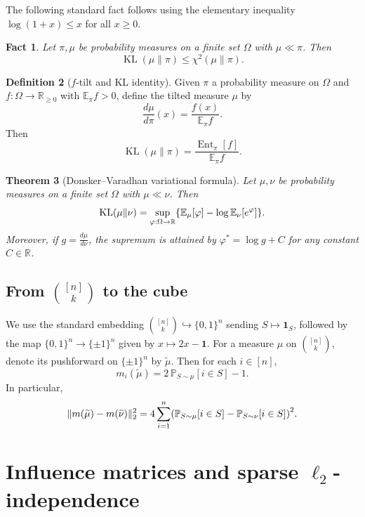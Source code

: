 \documentclass[11pt,reqno,letterpaper]{amsart}
\renewcommand{\P}{\mathbb{P}}
\numberwithin{equation}{section}
\newtheorem{theorem}{Theorem}[section]
\newtheorem{fact}[theorem]{Fact}
\theoremstyle{definition}
\newtheorem{definition}[theorem]{Definition}
\DeclareMathOperator{\Ent}{Ent}
\newcommand{\KL}{\operatorname{KL}}
\let\originalleft\left
\let\originalright\right
\renewcommand{\left}{\mathopen{}\mathclose\bgroup\originalleft}
\renewcommand{\right}{\aftergroup\egroup\originalright}
\begin{document}
The following standard fact follows using the elementary inequality $\log(1+x) \leq x$ for all $x \geq 0$.

\begin{fact}\label{fact:kl-chi2-inequality}
Let $\pi,\mu$ be probability measures on a finite set $\Omega$ with $\mu\ll \pi$. Then
\[
\KL(\mu\|\pi) \le \chi^2(\mu\|\pi).
\]
\end{fact}

\begin{definition}[$f$-tilt and KL identity]\label{def:f-tilt}
Given $\pi$ a probability measure on $\Omega$ and $f:\Omega\to\mathbb{R}_{\ge 0}$ with $\mathbb{E}_\pi f>0$,
define the tilted measure $\mu$ by
\[
\frac{d\mu}{d\pi}(x)=\frac{f(x)}{\mathbb{E}_\pi f}.
\]
Then
\begin{equation}\label{eq:EntKL}
\KL(\mu\|\pi)
=
\frac{\Ent_\pi[f]}{\mathbb{E}_\pi f}.
\end{equation}
\end{definition}

\begin{theorem}[Donsker--Varadhan variational formula]\label{thm:DV}
Let $\mu,\nu$ be probability measures on a finite set $\Omega$ with $\mu\ll\nu$. Then
\[
\KL(\mu\|\nu)
=\sup_{\varphi:\Omega\to\mathbb{R}}\left\{\mathbb{E}_\mu[\varphi]-\log\mathbb{E}_\nu[e^{\varphi}]\right\}.
\]
Moreover, if $g=\frac{d\mu}{d\nu}$, the supremum is attained by $\varphi^*=\log g + C$ for any constant $C\in\mathbb{R}$.
\end{theorem}

\subsection{From $\binom{[n]}{k}$ to the cube}\label{subsec:slice-embed}

We use the standard embedding $\binom{[n]}{k}\hookrightarrow\{0,1\}^n$ sending
$S\mapsto \mathbf{1}_S$, followed by the map $\{0,1\}^n\to\{\pm1\}^n$ given by $x\mapsto 2x-\mathbf{1}$.
For a measure $\mu$ on $\binom{[n]}{k}$, denote its pushforward on $\{\pm1\}^n$ by $\widetilde{\mu}$.
Then for each $i\in[n]$,
\[
m_i(\widetilde{\mu})=2\,\P_{S\sim \mu}[i\in S]-1.
\]
In particular,
\begin{equation}\label{eq:mean-vs-marg}
\|m(\widetilde{\mu})-m(\widetilde{\nu})\|_2^2
=
4\sum_{i=1}^n\left(\P_{S\sim \mu}[i\in S]-\P_{S\sim \nu}[i\in S]\right)^2.
\end{equation}

\section{Influence matrices and sparse $\ell_2$-independence}\label{sec:l2-indep}
\end{document}
